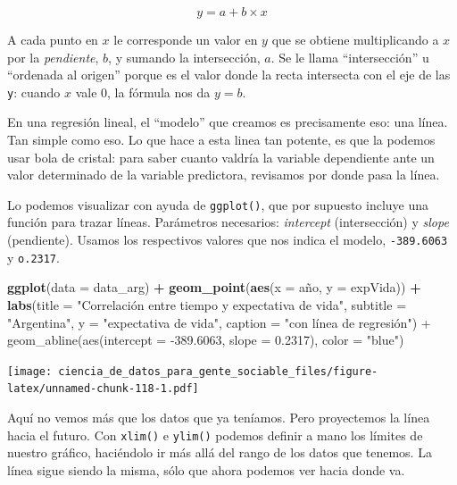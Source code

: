 \documentclass[]{book}
\newenvironment{Shaded}{\begin{snugshade}}{\end{snugshade}}
\newcommand{\KeywordTok}[1]{\textcolor[rgb]{0.13,0.29,0.53}{\textbf{#1}}}
\newcommand{\DataTypeTok}[1]{\textcolor[rgb]{0.13,0.29,0.53}{#1}}
\newcommand{\StringTok}[1]{\textcolor[rgb]{0.31,0.60,0.02}{#1}}
\newcommand{\OperatorTok}[1]{\textcolor[rgb]{0.81,0.36,0.00}{\textbf{#1}}}
\newcommand{\NormalTok}[1]{#1}
\begin{document}
\[ y = a + b \times x \]

A cada punto en \(x\) le corresponde un valor en \(y\) que se obtiene
multiplicando a \(x\) por la \emph{pendiente}, \(b\), y sumando la
intersección, \(a\). Se le llama ``intersección'' u ``ordenada al
origen'' porque es el valor donde la recta intersecta con el eje de las
\texttt{y}: cuando \(x\) vale \(0\), la fórmula nos da \(y = b\).

En una regresión lineal, el ``modelo'' que creamos es precisamente eso:
una línea. Tan simple como eso. Lo que hace a esta linea tan potente, es
que la podemos usar bola de cristal: para saber cuanto valdría la
variable dependiente ante un valor determinado de la variable
predictora, revisamos por donde pasa la línea.

Lo podemos visualizar con ayuda de \texttt{ggplot()}, que por supuesto
incluye una función para trazar líneas. Parámetros necesarios:
\emph{intercept} (intersección) y \emph{slope} (pendiente). Usamos los
respectivos valores que nos indica el modelo, \texttt{-389.6063} y
\texttt{o.2317}.

\begin{Shaded}
\begin{Highlighting}[]
\KeywordTok{ggplot}\NormalTok{(}\DataTypeTok{data =}\NormalTok{ data_arg) }\OperatorTok{+}\StringTok{ }
\StringTok{    }\KeywordTok{geom_point}\NormalTok{(}\KeywordTok{aes}\NormalTok{(}\DataTypeTok{x =}\NormalTok{ año, }\DataTypeTok{y =}\NormalTok{ expVida)) }\OperatorTok{+}
\StringTok{    }\KeywordTok{labs}\NormalTok{(}\DataTypeTok{title =} \StringTok{"Correlación entre tiempo y expectativa de vida"}\NormalTok{,}
         \DataTypeTok{subtitle =} \StringTok{"Argentina"}\NormalTok{,}
         \DataTypeTok{y =} \StringTok{"expectativa de vida"}\NormalTok{,}
         \DataTypeTok{caption =} \StringTok{"con línea de regresión") +}
\StringTok{    geom_abline(aes(intercept = -389.6063, slope = 0.2317), color = "}\NormalTok{blue}\StringTok{")}
\end{Highlighting}
\end{Shaded}

\texttt{[image: ciencia\_de\_datos\_para\_gente\_sociable\_files/figure-latex/unnamed-chunk-118-1.pdf]}

Aquí no vemos más que los datos que ya teníamos. Pero proyectemos la
línea hacia el futuro. Con \texttt{xlim()} e \texttt{ylim()} podemos
definir a mano los límites de nuestro gráfico, haciéndolo ir más allá
del rango de los datos que tenemos. La línea sigue siendo la misma, sólo
que ahora podemos ver hacia donde va.
\end{document}

